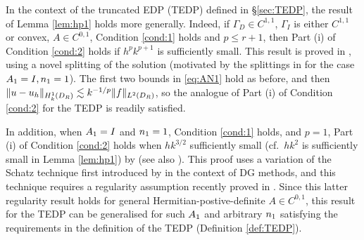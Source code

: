 In the context of the truncated EDP (TEDP) defined in \S\ref{sec:TEDP}, the result of Lemma \ref{lem:hp1} holds more generally. Indeed,
if $\Gamma_D\in C^{1,1}$, $\Gamma_I$ is either $C^{1,1}$ or convex, $A\in C^{0,1}$, Condition \ref{cond:1} holds and $p\leq r+1$, then Part (i) of Condition \ref{cond:2} holds
if $h^p k^{p+1}$ is sufficiently small. This result is proved 
in \cite{ChNi:18a}, using a novel splitting of the solution (motivated by the splittings in \cite{MeSa:10, MeSa:11} for the case $A_{1}= I, n_{1}=1$). The first two bounds in \eqref{eq:AN1} hold as before, and then 
$\|u-u_h\|_{\HokDR} \lesssim  k^{-1/p}\|f\|_{\LtDR}$, so the analogue of Part (i) of Condition \ref{cond:2} for the TEDP is readily satisfied.

In addition, when $A_{1}=I$ and $n_{1}=1$, Condition \ref{cond:1} holds, and $p=1$,  Part (i) of Condition \ref{cond:2} holds when $hk^{3/2}$ sufficiently small (cf.~$hk^2$ is sufficiently small in Lemma \ref{lem:hp1}) by 
\cite{ZhWu:13} (see also \cite{ChNi:18}). This proof uses 
a variation of the Schatz technique first introduced by \cite{FeWu:11} in the context of DG methods, and this technique requires a regularity assumption recently proved in \cite{ChNiTo:18}. Since this latter regularity result holds for general Hermitian-postive-definite $A\in C^{0,1}$, this result for the TEDP can be generalised for such $A_{1}$ and arbitrary $n_{1}$ satisfying the requirements in the definition of the TEDP (Definition \ref{def:TEDP}).
\ere


